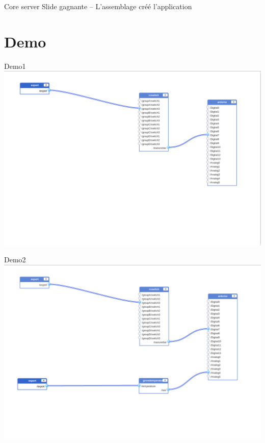 \documentclass{beamer}
\begin{document}
\begin{frame}{Core server}
Slide gagnante -- L'assemblage créé l'application
\end{frame}

\section{Demo}

\begin{frame}{Demo1}
\includegraphics[width=\columnwidth]{figures/config1.png}
\end{frame}

\begin{frame}{Demo2}
\includegraphics[width=\columnwidth]{figures/config2.png}
\end{frame}
\end{document}
